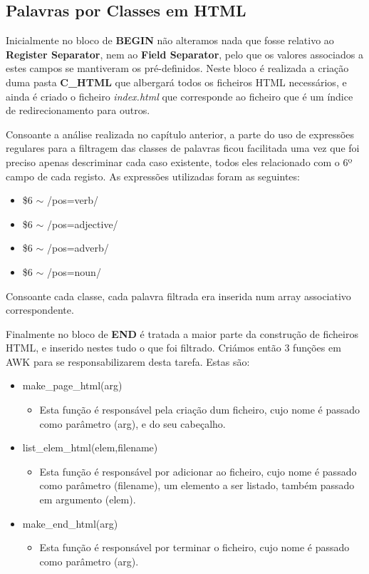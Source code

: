\documentclass[11pt,a4paper]{report}
\begin{document}
\newpage

\subsection{Palavras por Classes em HTML}
\label{sub:algoritmos3}

Inicialmente no bloco de \textbf{BEGIN} não alteramos nada que fosse relativo ao \textbf{Register Separator}, nem ao \textbf{Field Separator}, pelo que os valores associados a estes campos se mantiveram os pré-definidos. Neste bloco é realizada a criação duma pasta \textbf{C\_HTML} que albergará todos os ficheiros HTML necessários, e ainda é criado o ficheiro \textit{index.html} que corresponde ao ficheiro que é um índice de redirecionamento para outros.

Consoante a análise realizada no capítulo anterior, a parte do uso de expressões regulares para a filtragem das classes de palavras ficou facilitada uma vez que foi preciso apenas descriminar cada caso existente, todos eles relacionado com o 6º campo de cada registo. As expressões utilizadas foram as seguintes:

\begin{itemize}
	\item \$6 $\sim$ /pos=verb/
	\item \$6 $\sim$ /pos=adjective/
	\item \$6 $\sim$ /pos=adverb/
	\item \$6 $\sim$ /pos=noun/
\end{itemize}

Consoante cada classe, cada palavra filtrada era inserida num array associativo correspondente.

Finalmente no bloco de \textbf{END} é tratada a maior parte da construção de ficheiros HTML, e inserido nestes tudo o que foi filtrado. Criámos então 3 funções em AWK para se responsabilizarem desta tarefa. Estas são:

\begin{itemize}
	\item make\_page\_html(arg)
	\begin{itemize}
		\item Esta função é responsável pela criação dum ficheiro, cujo nome é passado como parâmetro (arg), e do seu cabeçalho.
	\end{itemize}
	\item list\_elem\_html(elem,filename)
	\begin{itemize}
		\item Esta função é responsável por adicionar ao ficheiro, cujo nome é passado como parâmetro (filename), um elemento a ser listado, também passado em argumento (elem).
	\end{itemize}
	\item make\_end\_html(arg)
	\begin{itemize}
		\item Esta função é responsável por terminar o ficheiro, cujo nome é passado como parâmetro (arg).
	\end{itemize}
\end{itemize}
\end{document}
